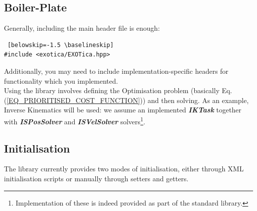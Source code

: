 \documentclass[12pt,a4paper,onecolumn]{article}
\begin{document}
\subsection{Boiler-Plate}
Generally, including the main header file is enough:
\begin{lstlisting} [belowskip=-1.5 \baselineskip]
#include <exotica/EXOTica.hpp>
\end{lstlisting}
Additionally, you may need to include implementation-specific headers for functionality which you implemented.\\
\newline
\noindent Using the library involves defining the Optimisation problem (basically Eq.(\ref{EQ_PRIORITISED_COST_FUNCTION})) and then solving. As an example, Inverse Kinematics will be used: we assume an implemented \textit{\textbf{IKTask}} together with \textit{\textbf{ISPosSolver}} and \textbf{\textit{ISVelSolver}} solvers\footnote{Implementation of these is indeed provided as part of the standard library.}.


\subsection{Initialisation}
The library currently provides two modes of initialisation, either through XML initialisation scripts or manually through setters and getters.
\end{document}
